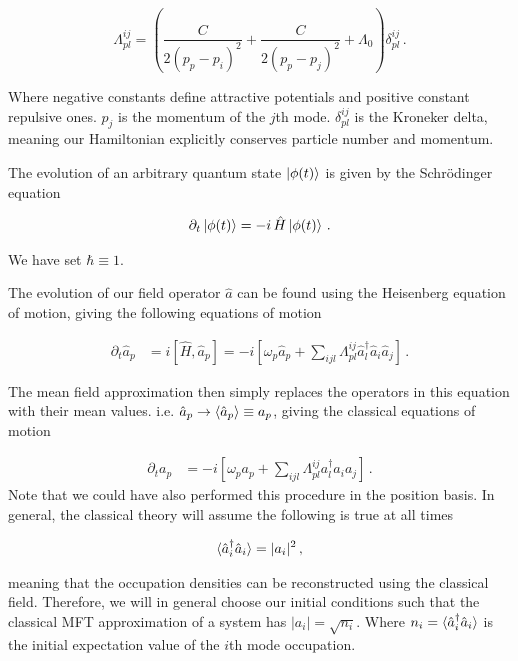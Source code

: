 \documentclass[aps,prd,twocolumn,superscriptaddress]{revtex4-1}
\begin{document}
\begin{equation} \label{Lambda}
    \Lambda^{ij}_{pl} = \left( \frac{C}{2(p_p - p_i)^2} + \frac{C}{2(p_p - p_j)^2} + \Lambda_0 \right) \delta^{ij}_{pl} \, .
\end{equation}

Where negative constants define attractive potentials and positive constant repulsive ones. $p_j$ is the momentum of the $j$th mode. $\delta^{ij}_{pl}$ is the Kroneker delta, meaning our Hamiltonian explicitly conserves particle number and momentum. 

The evolution of an arbitrary quantum state $\ket{\phi (t)}$ is given by the Schr\"odinger equation

\begin{align}
    \partial_t \ket{\phi(t)} = -i \,  \hat H \ket{\phi(t)} \, .
\end{align}

We have set $\hbar \equiv 1$. 

The evolution of our field operator $\hat a$ can be found using the Heisenberg equation of motion\cite{Ball}, giving the following equations of motion

\begin{align} \label{eqnMotion}
    \partial_t \hat a_p &= i [\hat H, \hat a_p]  
    = -i\left[ \omega_p \hat a_p + \sum_{ijl} \Lambda^{ij}_{pl} \hat a_l^\dagger \hat a_i \hat a_j \right] \, .
\end{align}

The mean field approximation then simply replaces the operators in this equation with their mean values. i.e. $\hat a_p \rightarrow \braket{\hat a_p} \equiv a_p$, giving the classical equations of motion

\begin{align} \label{clEqnMotion}
    \partial_t  a_p &=  -i\left[ \omega_p  a_p + \sum_{ijl} \Lambda^{ij}_{pl} a_l^\dagger a_i a_j \right] \, .
\end{align}
Note that we could have also performed this procedure in the position basis. In general, the classical theory will assume the following is true at all times

\begin{align} \label{clAssumption}
    \braket{\hat a_i^\dagger \hat a_i} = |a_i|^2 \, ,
\end{align}

meaning that the occupation densities can be reconstructed using the classical field. Therefore, we will in general choose our initial conditions such that the classical MFT approximation of a system has $|a_i| = \sqrt{n_i}$. Where $n_i = \braket{\hat a_i^\dagger \hat a_i}$ is the initial expectation value of the $i$th mode occupation.
\end{document}
